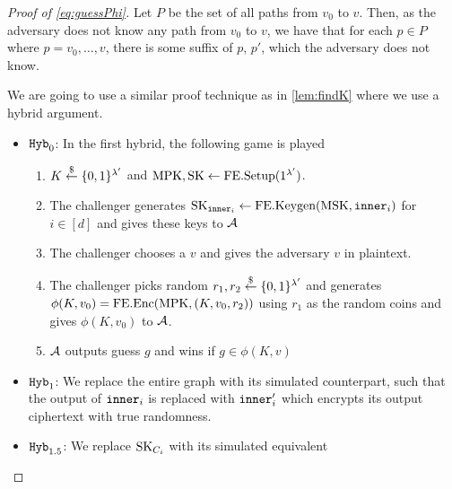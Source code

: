\begin{proof}[Proof of \cref{eq:guessPhi}]
	Let $P$ be the set of all paths from $v_0$ to $v$. Then, as the adversary does not know any path from $v_0$ to $v$,
	we have that for each $p \in P$ where $p = v_0, \dots, v$, there is some suffix of $p$, $p'$, which the adversary does not know.

	We are going to use a similar proof technique as in \cref{lem:findK} where we use a hybrid argument.
	\begin{itemize}
		\item $\texttt{Hyb}_0$: In the first hybrid, the following game is played
			\begin{enumerate}
				\item $K \overset{\$}{\gets} \{0,1\}^{\lambda'}$ and $\text{MPK}, \text{SK} \gets \text{FE.Setup}(1^{\lambda'})$.
				\item The challenger generates $\text{SK}_{\texttt{inner}_i} \gets \text{FE.Keygen}(\text{MSK}, \texttt{inner}_i)$ for $i \in [d]$ and gives these keys to $\mathcal{A}$
				\item The challenger chooses a $v$ and gives the adversary $v$ in plaintext.
				\item The challenger picks random $r_1, r_2 \overset{\$}{\gets} \{0,1\}^{\lambda'}$ and generates $\phi(K, v_0) = \text{FE.Enc}(\text{MPK}, (K, v_0, r_2))$ using $r_1$ as the random coins and gives $\phi(K, v_0)$ to $\mathcal{A}$.
				\item $\mathcal{A}$ outputs guess $g$ and wins if $g \in \phi(K, v)$
			\end{enumerate}
		\item $\texttt{Hyb}_1$: We replace the entire graph with its simulated counterpart, such that
		the output of $\texttt{inner}_i$ is replaced with $\texttt{inner}_i'$ which encrypts its output ciphertext with true randomness.

		\item $\texttt{Hyb}_{1.5}$: We replace $\text{SK}_{C_i}$ with its simulated equivalent
		

\end{itemize}
\end{proof}
